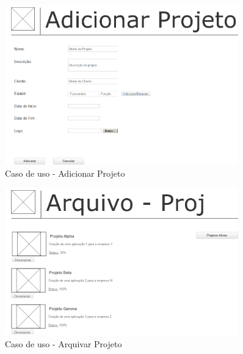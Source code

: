 \begin{figure}[H]
  \center
  \includegraphics[width=0.9\textwidth]{figuras/Prototipo8}
  \caption{Caso de uso - Adicionar Projeto}
  \label{fig:uc-adicionar-projeto}
\end{figure}

\begin{figure}[H]
  \center
  \includegraphics[width=0.9\textwidth]{figuras/Prototipo9}
  \caption{Caso de uso - Arquivar Projeto}
  \label{fig: uc-arquivar-projeto}
\end{figure}
